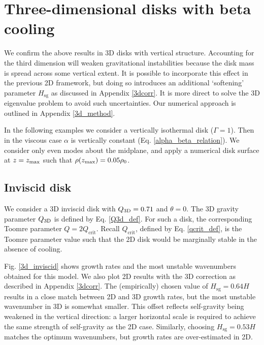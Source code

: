 \section{Three-dimensional disks with beta cooling}\label{3ddisk}
We confirm the above results in 3D disks with vertical
structure. Accounting for the third dimension will weaken gravitational instabilities
because the disk mass is spread across some vertical extent. It is 
possible to incorporate this effect in the previous 2D framework, but doing so
introduces an additional `softening' parameter $H_\mathrm{sg}$ as discussed in
Appendix \ref{3dcorr}. It is more direct to solve the 3D eigenvalue
problem to avoid such uncertainties. Our numerical approach is
outlined in Appendix \ref{3d_method}. 


In the following examples we consider a vertically isothermal disk
($\Gamma=1$). Then in the viscous case $\alpha$ is vertically
constant (Eq. \ref{alpha_beta_relation}). We consider only even modes
about the midplane, and apply a numerical disk surface at $z=z_\mathrm{max}$
such that $\rho(z_\mathrm{max})=0.05\rho_0$.     

\subsection{Inviscid disk}

We consider a 3D inviscid disk with $Q_\mathrm{3D}=0.71$ and $\theta=0$. 
The 3D gravity parameter $Q_\mathrm{3D}$ is defined by 
Eq. \ref{Q3d_def}. For such a disk, the corresponding Toomre parameter 
$Q=2Q_\mathrm{crit}$. Recall $Q_\mathrm{crit}$, defined by
Eq. \ref{qcrit_def}, is the Toomre parameter value such that the 2D
disk would be marginally stable in the absence of cooling. 

Fig. \ref{3d_inviscid} shows growth rates and the most unstable
wavenumbers obtained for this model. We also plot 2D
results with the 3D correction as described in Appendix
\ref{3dcorr}. The (empirically) chosen value of 
$H_\mathrm{sg}=0.64H$ results in a close match between 2D and 3D
growth rates, but the most unstable wavenumber in 3D is somewhat smaller. 
This offset reflects self-gravity being weakened in the vertical 
direction: a larger horizontal scale is required to achieve the same
strength of self-gravity as the 2D case. Similarly, 
choosing $H_\mathrm{sg}=0.53H$ matches the optimum wavenumbers, but
growth rates are over-estimated in 2D.    

